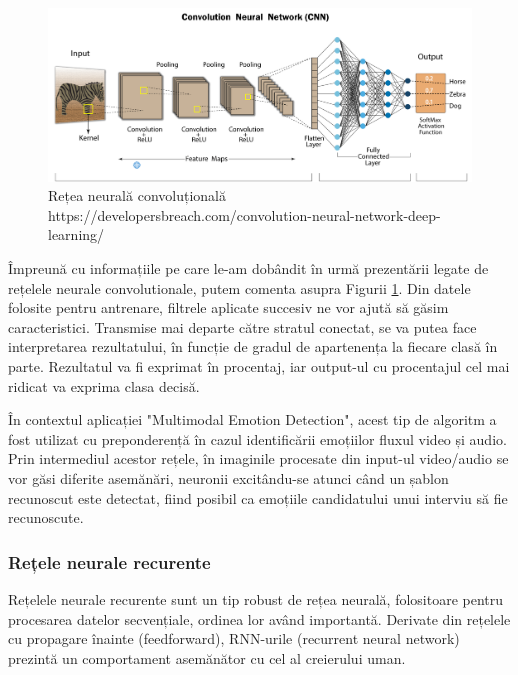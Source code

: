 \documentclass[a4paper, 12pt]{report}
\begin{document}
	\clearpage
	\begin{figure}[h]
		\begin{center}
			\includegraphics[scale=0.29]{images/cnn.png}
		\end{center}
		\caption{Rețea neurală convoluțională\newline
			\hspace{\linewidth}https://developersbreach.com/convolution-neural-network-deep-learning/}
		\label{fig:cnn}
	\end{figure}
	
	Împreună cu informațiile pe care le-am dobândit în urmă prezentării legate de rețelele neurale convolutionale, putem comenta asupra Figurii \ref{fig:cnn}. Din datele folosite pentru antrenare, filtrele aplicate succesiv ne vor ajută să găsim caracteristici. Transmise mai departe către stratul conectat, se va putea face interpretarea rezultatului, în funcție de gradul de apartenența la fiecare clasă în parte. Rezultatul va fi exprimat în procentaj, iar output-ul cu procentajul cel mai ridicat va exprima clasa decisă.
	
	În contextul aplicației "Multimodal Emotion Detection", acest tip de algoritm a fost utilizat cu preponderență în cazul identificării emoțiilor fluxul video și audio. Prin intermediul acestor rețele, în imaginile procesate din input-ul video/audio se vor găsi diferite asemănări, neuronii excitându-se atunci când un șablon recunoscut este detectat, fiind posibil ca emoțiile candidatului unui interviu să fie recunoscute. 
	
	\clearpage
	\subsubsection{Rețele neurale recurente}
	Rețelele neurale recurente sunt un tip robust de rețea neurală, folositoare pentru procesarea datelor secvențiale, ordinea lor având importantă. Derivate din rețelele cu propagare înainte (feedforward), RNN-urile (recurrent neural network) prezintă un comportament asemănător cu cel al creierului uman.
\end{document}
